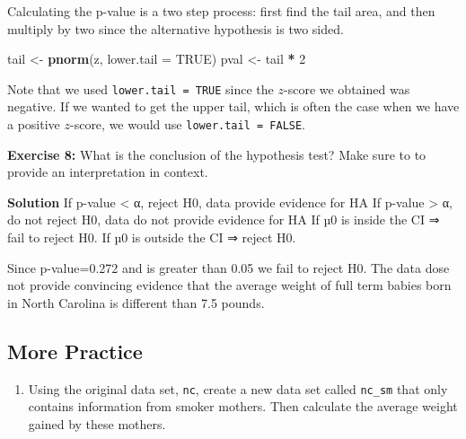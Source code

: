 \documentclass[
]{article}
\newenvironment{Shaded}{\begin{snugshade}}{\end{snugshade}}
\newcommand{\AttributeTok}[1]{\textcolor[rgb]{0.13,0.29,0.53}{#1}}
\newcommand{\ConstantTok}[1]{\textcolor[rgb]{0.56,0.35,0.01}{#1}}
\newcommand{\DecValTok}[1]{\textcolor[rgb]{0.00,0.00,0.81}{#1}}
\newcommand{\FunctionTok}[1]{\textcolor[rgb]{0.13,0.29,0.53}{\textbf{#1}}}
\newcommand{\NormalTok}[1]{#1}
\newcommand{\OtherTok}[1]{\textcolor[rgb]{0.56,0.35,0.01}{#1}}
\newcommand{\SpecialCharTok}[1]{\textcolor[rgb]{0.81,0.36,0.00}{\textbf{#1}}}
\newcommand{\StringTok}[1]{\textcolor[rgb]{0.31,0.60,0.02}{#1}}
\providecommand{\tightlist}{%
  \setlength{\itemsep}{0pt}\setlength{\parskip}{0pt}}
\begin{document}
Calculating the p-value is a two step process: first find the tail area,
and then multiply by two since the alternative hypothesis is two sided.

\begin{Shaded}
\begin{Highlighting}[]
\NormalTok{tail }\OtherTok{\textless{}{-}} \FunctionTok{pnorm}\NormalTok{(z, }\AttributeTok{lower.tail =} \ConstantTok{TRUE}\NormalTok{)}
\NormalTok{pval }\OtherTok{\textless{}{-}}\NormalTok{ tail }\SpecialCharTok{*} \DecValTok{2}
\end{Highlighting}
\end{Shaded}

Note that we used \texttt{lower.tail\ =\ TRUE} since the \(z\)-score we
obtained was negative. If we wanted to get the upper tail, which is
often the case when we have a positive \(z\)-score, we would use
\texttt{lower.tail\ =\ FALSE}.

\textbf{Exercise 8:} What is the conclusion of the hypothesis test? Make
sure to to provide an interpretation in context.

\textbf{Solution} If p-value \textless{} α, reject H0, data provide
evidence for HA If p-value \textgreater{} α, do not reject H0, data do
not provide evidence for HA If µ0 is inside the CI ⇒ fail to reject H0.
If µ0 is outside the CI ⇒ reject H0.

Since p-value=0.272 and is greater than 0.05 we fail to reject H0. The
data dose not provide convincing evidence that the average weight of
full term babies born in North Carolina is different than 7.5 pounds.

\subsection{More Practice}\label{more-practice}

\begin{enumerate}
\def\labelenumi{\arabic{enumi}.}
\tightlist
\item
  Using the original data set, \texttt{nc}, create a new data set called
  \texttt{nc\_sm} that only contains information from smoker mothers.
  Then calculate the average weight gained by these mothers.
\end{enumerate}

\begin{Shaded}
\end{Shaded}
\end{document}
